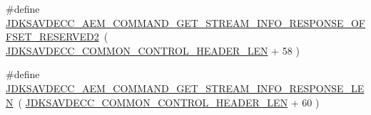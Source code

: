 \begin{DoxyCompactItemize}
\item 
\#define \hyperlink{group__command__get__stream__info__response_gad253a2dae6b1946d274f303769a00c3c}{J\+D\+K\+S\+A\+V\+D\+E\+C\+C\+\_\+\+A\+E\+M\+\_\+\+C\+O\+M\+M\+A\+N\+D\+\_\+\+G\+E\+T\+\_\+\+S\+T\+R\+E\+A\+M\+\_\+\+I\+N\+F\+O\+\_\+\+R\+E\+S\+P\+O\+N\+S\+E\+\_\+\+O\+F\+F\+S\+E\+T\+\_\+\+R\+E\+S\+E\+R\+V\+E\+D2}~( \hyperlink{group__jdksavdecc__avtp__common__control__header_gaae84052886fb1bb42f3bc5f85b741dff}{J\+D\+K\+S\+A\+V\+D\+E\+C\+C\+\_\+\+C\+O\+M\+M\+O\+N\+\_\+\+C\+O\+N\+T\+R\+O\+L\+\_\+\+H\+E\+A\+D\+E\+R\+\_\+\+L\+EN} + 58 )
\item 
\#define \hyperlink{group__command__get__stream__info__response_gadc90f2ed9487ca14a3d1fbceddaee551}{J\+D\+K\+S\+A\+V\+D\+E\+C\+C\+\_\+\+A\+E\+M\+\_\+\+C\+O\+M\+M\+A\+N\+D\+\_\+\+G\+E\+T\+\_\+\+S\+T\+R\+E\+A\+M\+\_\+\+I\+N\+F\+O\+\_\+\+R\+E\+S\+P\+O\+N\+S\+E\+\_\+\+L\+EN}~( \hyperlink{group__jdksavdecc__avtp__common__control__header_gaae84052886fb1bb42f3bc5f85b741dff}{J\+D\+K\+S\+A\+V\+D\+E\+C\+C\+\_\+\+C\+O\+M\+M\+O\+N\+\_\+\+C\+O\+N\+T\+R\+O\+L\+\_\+\+H\+E\+A\+D\+E\+R\+\_\+\+L\+EN} + 60 )
\end{DoxyCompactItemize}
